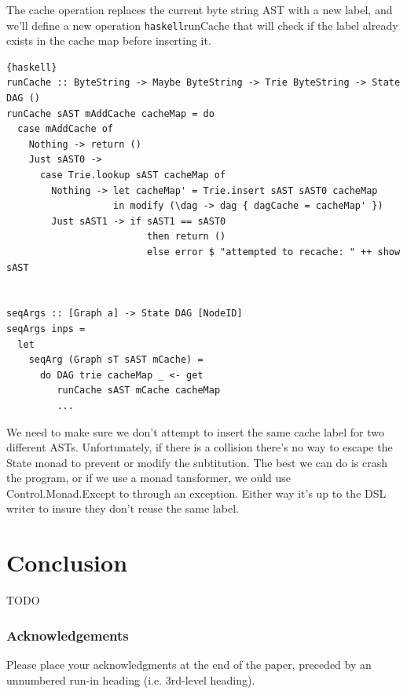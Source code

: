 \documentclass[runningheads]{llncs}
\begin{document}
The cache operation replaces the current byte string AST with a new label, and
we'll define a new operation \lstinline{haskell}{runCache} that will check if
the label already exists in the cache map before inserting it.
\begin{lstlisting}{haskell}
runCache :: ByteString -> Maybe ByteString -> Trie ByteString -> State DAG ()
runCache sAST mAddCache cacheMap = do
  case mAddCache of
    Nothing -> return ()
    Just sAST0 ->
      case Trie.lookup sAST cacheMap of
        Nothing -> let cacheMap' = Trie.insert sAST sAST0 cacheMap
                   in modify (\dag -> dag { dagCache = cacheMap' })
        Just sAST1 -> if sAST1 == sAST0
                         then return ()
                         else error $ "attempted to recache: " ++ show sAST


seqArgs :: [Graph a] -> State DAG [NodeID]
seqArgs inps =
  let
    seqArg (Graph sT sAST mCache) =
      do DAG trie cacheMap _ <- get
         runCache sAST mCache cacheMap
         ...
\end{lstlisting}
We need to make sure we don't attempt to insert the same cache label for two
different ASTs. Unfortunately, if there is a collision there's no way to escape
the State monad to prevent or modify the subtitution. The best we can do is
crash the program, or if we use a monad tansformer, we ould use
Control.Monad.Except to through an exception. Either way it's up to the DSL
writer to insure they don't reuse the same label. 

\section{Conclusion}
TODO

\subsubsection{Acknowledgements} Please place your acknowledgments at
the end of the paper, preceded by an unnumbered run-in heading (i.e.
3rd-level heading).

%
%


\end{document}
